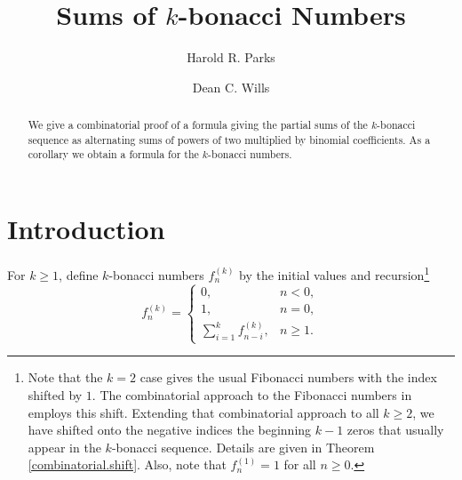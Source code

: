 \documentclass[11pt,reqno]{amsart}
\makeatletter
\newcommand{\journal}[1]{\def\@journal{\uppercase{#1}}}
\newcommand{\monthyear}[1]{%
  \def\@monthyear{\uppercase{#1}}}
\newcommand{\volnumber}[1]{%
  \def\@volnumber{\uppercase{#1}}}
\theoremstyle{plain}
\numberwithin{equation}{section}
\makeatother
\begin{document}
\monthyear{}
\journal{}
\volnumber{}


\setcounter{page}{1}

\title{Sums of  $k$-bonacci Numbers}
\author{Harold R. Parks}
\address {Department of Mathematics\\
 Oregon State University\\ 
 Corvallis\\ 
 Oregon 97331 USA}
\author{Dean C. Wills}
\address{Cisco, San Francisco, California 94107 USA}

\begin{abstract}


We give a combinatorial  proof of a formula giving
the partial sums of the $k$-bonacci sequence
as alternating sums of powers of two multiplied by binomial 
coefficients.
As  a corollary we obtain a  formula for the $k$-bonacci numbers.
 



\end{abstract}

\maketitle

\section{Introduction}

For $k \geq 1$, define $k$-bonacci numbers $f_n^{(k)}$ by the initial values and recursion\footnote{Note that the $k=2$ case gives the usual Fibonacci numbers
with the index shifted by $1$. The combinatorial approach to the
Fibonacci numbers in  \cite{10.4169/j.ctt6wpwjh}  employs this
shift. Extending that combinatorial approach to all  $k\geq 2$, we have
shifted onto the negative indices the beginning $k-1$ zeros that 
usually appear in the $k$-bonacci sequence. Details are given 
in Theorem \ref{combinatorial.shift}. 
Also, note that  $f_{n}^{(1)}=1$ for all $n \ge 0$.}
\begin{equation}\label{fib.recur}
f_n^{(k)} = 
\begin{cases}
       0, &   n < 0, \\
       1, &   n = 0, \\
            \sum_{i=1}^k f_{n-i}^{(k)}, & n\geq 1.
\end{cases}
\end{equation}
\vspace{1em}
\end{document}
